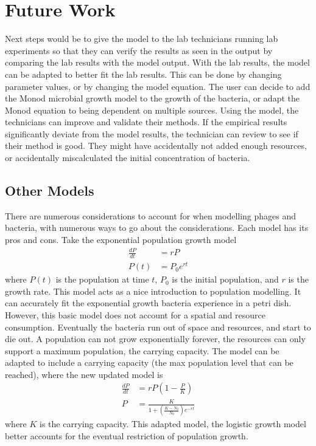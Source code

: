 \section{Future Work}
\label{Future Work}
Next steps would be to give the model to the lab technicians running lab experiments so that they can verify the results as seen in the output by comparing the lab results with the model output. 
With the lab results, the model can be adapted to better fit the lab results. 
This can be done by changing parameter values, or by changing the model equation. 
The user can decide to add the Monod microbial growth model to the growth of the bacteria, or adapt the Monod equation to being dependent on multiple sources. 
Using the model, the technicians can improve and validate their methods. 
If the empirical results significantly deviate from the model results, the technician can review to see if their method is good. 
They might have accidentally not added enough resources, or accidentally miscalculated the initial concentration of bacteria. 

\subsection{Other Models}
There are numerous considerations to account for when modelling phages and bacteria, with numerous ways to go about the considerations. 
Each model has its pros and cons. 
Take the exponential population growth model 
\begin{align}
    \frac{dP}{dt} &= rP \\
    P(t) &= P_0e^{rt} 
\end{align}
where $P(t)$ is the population at time $t$, $P_0$ is the initial population, and $r$ is the growth rate. 
This model acts as a nice introduction to population modelling. It can accurately fit the exponential growth bacteria experience in a petri dish. 
However, this basic model does not account for a spatial and resource consumption. 
Eventually the bacteria run out of space and resources, and start to die out. 
A population can not grow exponentially forever, the resources can only support a maximum population, the carrying capacity. 
The model can be adapted to include a carrying capacity (the max population level that can be reached), where the new updated model is 
\begin{align}
    \frac{dP}{dt} &= rP(1-\frac{P}{K}) \\ 
    P &= \frac{K}{1 + (\frac{K-N_0}{N_0})e^{-rt}}
\end{align}
where $K$ is the carrying capacity. This adapted model, the logistic growth model better accounts for the eventual restriction of population growth. 

